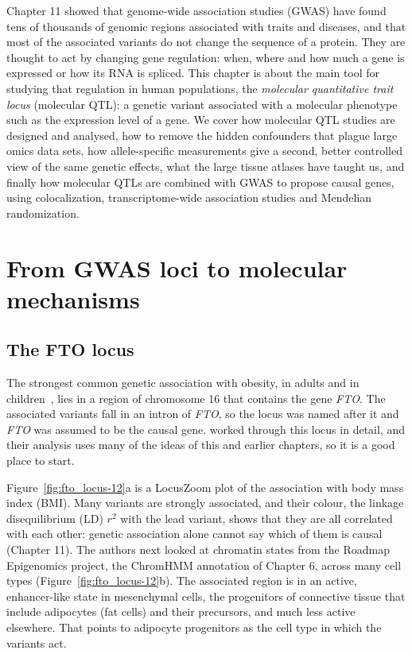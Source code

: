 Chapter 11 showed that genome-wide association studies (GWAS) have found tens of thousands of genomic regions associated with traits and diseases, and that most of the associated variants do not change the sequence of a protein. They are thought to act by changing gene regulation: when, where and how much a gene is expressed or how its RNA is spliced. This chapter is about the main tool for studying that regulation in human populations, the \emph{molecular quantitative trait locus} (molecular QTL): a genetic variant associated with a molecular phenotype such as the expression level of a gene. We cover how molecular QTL studies are designed and analysed, how to remove the hidden confounders that plague large omics data sets, how allele-specific measurements give a second, better controlled view of the same genetic effects, what the large tissue atlases have taught us, and finally how molecular QTLs are combined with GWAS to propose causal genes, using colocalization, transcriptome-wide association studies and Mendelian randomization.

\section{From GWAS loci to molecular mechanisms}

\subsection{The FTO locus}

The strongest common genetic association with obesity, in adults and in children~\citep{bradfield2012}, lies in a region of chromosome 16 that contains the gene \textit{FTO}. The associated variants fall in an intron of \textit{FTO}, so the locus was named after it and \textit{FTO} was assumed to be the causal gene. \citet{claussnitzer2015} worked through this locus in detail, and their analysis uses many of the ideas of this and earlier chapters, so it is a good place to start.

Figure~\ref{fig:fto_locus-12}a is a LocusZoom plot of the association with body mass index (BMI). Many variants are strongly associated, and their colour, the linkage disequilibrium (LD) $r^2$ with the lead variant, shows that they are all correlated with each other: genetic association alone cannot say which of them is causal (Chapter 11). The authors next looked at chromatin states from the Roadmap Epigenomics project, the ChromHMM annotation of Chapter 6, across many cell types (Figure~\ref{fig:fto_locus-12}b). The associated region is in an active, enhancer-like state in mesenchymal cells, the progenitors of connective tissue that include adipocytes (fat cells) and their precursors, and much less active elsewhere. That points to adipocyte progenitors as the cell type in which the variants act.

